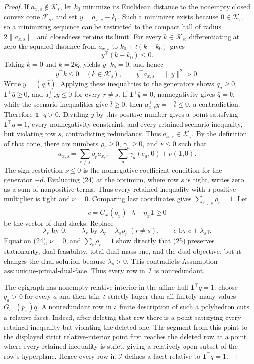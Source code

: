\documentclass{article}
\begin{document}
\begin{proof}
If \(a_{x,s}\notin\mathcal K_s\), let \(k_0\) minimize its Euclidean distance to the nonempty closed convex cone \(\mathcal K_s\), and set \(y=a_{x,s}-k_0\).  Such a minimizer exists because \(0\in\mathcal K_s\), so a minimizing sequence can be restricted to the compact ball of radius \(2\|a_{x,s}\|\), and closedness retains its limit.  For every \(k\in\mathcal K_s\), differentiating at zero the squared distance from \(a_{x,s}\) to \(k_0+t(k-k_0)\) gives
\[
 y^\top(k-k_0)\leq0.
\]
Taking \(k=0\) and \(k=2k_0\) yields \(y^\top k_0=0\), and hence
\[
 y^\top k\leq0\quad(k\in\mathcal K_s),
 \qquad
 y^\top a_{x,s}=\|y\|^2>0.
\]
Write \(y=(\bar q,\bar t)\).  Applying these inequalities to the generators shows \(\bar q_a\geq0\), \(\mathbf 1^\top\bar q\geq0\), and \(a_{x,r}^\top y\leq0\) for every \(r\ne s\).  If \(\mathbf 1^\top\bar q=0\), nonnegativity gives \(\bar q=0\), while the scenario inequalities give \(\bar t\geq0\); then \(a_{x,s}^\top y=-\bar t\leq0\), a contradiction.  Therefore \(\mathbf 1^\top\bar q>0\).  Dividing \(y\) by this positive number gives a point satisfying \(\mathbf 1^\top q=1\), every nonnegativity constraint, and every retained scenario inequality, but violating row \(s\), contradicting redundancy.  Thus \(a_{x,s}\in\mathcal K_s\).  By the definition of that cone, there are numbers \(\rho_r\geq0\), \(\gamma_a\geq0\), and \(\nu\leq0\) such that
\[
 a_{x,s}
 =\sum_{r\ne s}\rho_r a_{x,r}
   -\sum_a\gamma_a(e_a,0)+\nu(\mathbf 1,0).
 \tag{24}
\]
The sign restriction \(\nu\leq0\) is the nonnegative coefficient condition for the generator \(-d\).  Evaluating (24) at the optimum, where row \(s\) is tight, writes zero as a sum of nonpositive terms.  Thus every retained inequality with a positive multiplier is tight and \(\nu=0\).  Comparing last coordinates gives \(\sum_{r\ne s}\rho_r=1\).  Let
\[
 c=G_x(p_x)^\top\lambda-\eta_x\mathbf 1\geq0
\]
be the vector of dual slacks.  Replace
\[
 \lambda_s\text{ by }0,\qquad
 \lambda_r\text{ by }\lambda_r+\lambda_s\rho_r\ (r\ne s),
 \qquad c\text{ by }c+\lambda_s\gamma.
 \tag{25}
\]
Equation (24), \(\nu=0\), and \(\sum_r\rho_r=1\) show directly that (25) preserves stationarity, dual feasibility, total dual mass one, and the dual objective, but it changes the dual solution because \(\lambda_s>0\).  This contradicts Assumption \(\mathrm{ass{:}unique\mbox{-}primal\mbox{-}dual\mbox{-}face}\).  Thus every row in \(\mathcal I\) is nonredundant.

The epigraph has nonempty relative interior in the affine hull \(\mathbf 1^\top q=1\): choose \(q_a>0\) for every \(a\) and then take \(t\) strictly larger than all finitely many values \(G_{s,\cdot}(p_x)q\).  A nonredundant row in a finite description of such a polyhedron cuts a relative facet.  Indeed, after deleting that row there is a point satisfying every retained inequality but violating the deleted one.  The segment from this point to the displayed strict relative-interior point first reaches the deleted row at a point where every retained inequality is strict, giving a relatively open subset of the row's hyperplane.  Hence every row in \(\mathcal I\) defines a facet relative to \(\mathbf 1^\top q=1\).


\end{proof}
\end{document}
